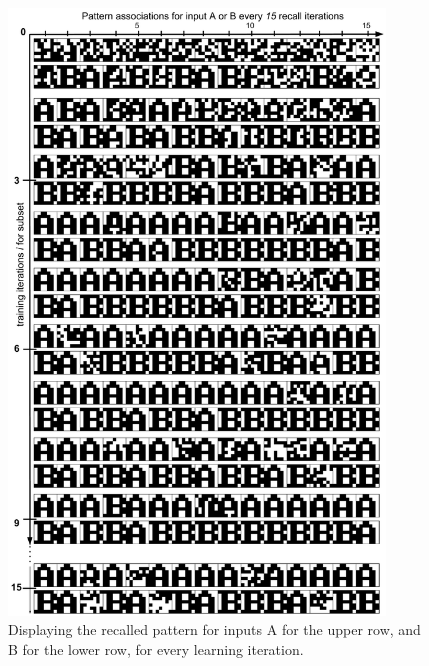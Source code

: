 \begin{figure}
    \centering
    \includegraphics[width=10cm]{fig/AB-pattern-associations-sync-tm0-dgw25}
    \caption{Displaying the recalled pattern for inputs A for the upper row, and B for the lower row, for every learning iteration.}
    \label{fig:pattern_associations_sync}
\end{figure}

